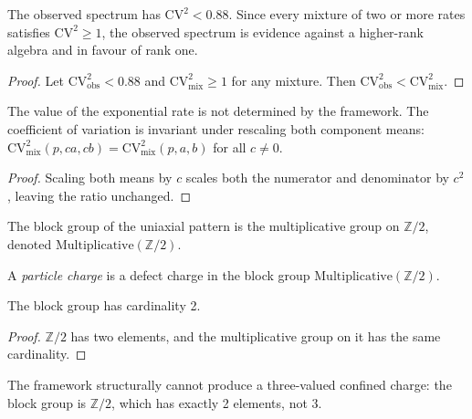 \begin{theorem}
The observed spectrum has $\mathrm{CV}^2 < 0.88$. Since every mixture of two or more rates satisfies $\mathrm{CV}^2 \geq 1$, the observed spectrum is evidence against a higher-rank algebra and in favour of rank one.
\end{theorem}

\begin{proof}
Let $\mathrm{CV}^2_{\mathrm{obs}} < 0.88$ and $\mathrm{CV}^2_{\mathrm{mix}} \geq 1$ for any mixture. Then $\mathrm{CV}^2_{\mathrm{obs}} < \mathrm{CV}^2_{\mathrm{mix}}$.
\end{proof}

\begin{theorem}
The value of the exponential rate is not determined by the framework. The coefficient of variation is invariant under rescaling both component means: $\mathrm{CV}^2_{\mathrm{mix}}(p, ca, cb) = \mathrm{CV}^2_{\mathrm{mix}}(p, a, b)$ for all $c \neq 0$.
\end{theorem}

\begin{proof}
Scaling both means by $c$ scales both the numerator and denominator by $c^2$, leaving the ratio unchanged.
\end{proof}

\begin{definition}
The block group of the uniaxial pattern is the multiplicative group on $\mathbb{Z}/2$, denoted $\mathrm{Multiplicative}(\mathbb{Z}/2)$.
\end{definition}

\begin{definition}
A \emph{particle charge} is a defect charge in the block group $\mathrm{Multiplicative}(\mathbb{Z}/2)$.
\end{definition}

\begin{theorem}
The block group has cardinality 2.
\end{theorem}

\begin{proof}
$\mathbb{Z}/2$ has two elements, and the multiplicative group on it has the same cardinality.
\end{proof}

\begin{theorem}
The framework structurally cannot produce a three-valued confined charge: the block group is $\mathbb{Z}/2$, which has exactly 2 elements, not 3.
\end{theorem}

